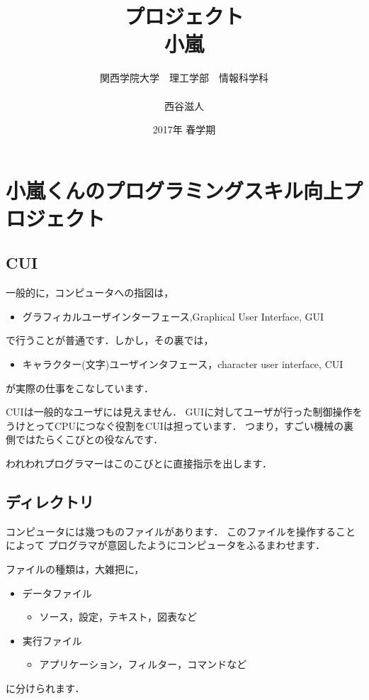 \documentclass[12pt,a4paper]{jsarticle}
\begin{document}
\title{プロジェクト\\
\vspace{4cm} 小嵐}
\author{ 関西学院大学　理工学部　情報科学科\\\\西谷滋人}
\date{\vspace{3cm} 2017年  春学期}
\maketitle
\setcounter{tocdepth}{6}
\tableofcontents

\tableofcontents
\section{小嵐くんのプログラミングスキル向上プロジェクト}
\subsection{CUI}
一般的に，コンピュータへの指図は，

\begin{itemize}
\item グラフィカルユーザインターフェース,Graphical User Interface, GUI
\end{itemize}
で行うことが普通です．しかし，その裏では，

\begin{itemize}
\item キャラクター(文字)ユーザインタフェース，character user interface, CUI
\end{itemize}
が実際の仕事をこなしています．

CUIは一般的なユーザには見えません．
GUIに対してユーザが行った制御操作を
うけとってCPUにつなぐ役割をCUIは担っています．
つまり，すごい機械の裏側ではたらくこびとの役なんです．

われわれプログラマーはこのこびとに直接指示を出します．

\subsection{ディレクトリ}
コンピュータには幾つものファイルがあります．
このファイルを操作することによって
プログラマが意図したようにコンピュータをふるまわせます．

ファイルの種類は，大雑把に，

\begin{itemize}
\item データファイル
\begin{itemize}
\item ソース，設定，テキスト，図表など
\end{itemize}
\item 実行ファイル
\begin{itemize}
\item アプリケーション，フィルター，コマンドなど
\end{itemize}
\end{itemize}
に分けられます．
\end{document}
